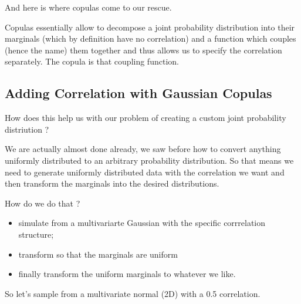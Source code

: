 \documentclass[11pt]{article}
\providecommand{\tightlist}{%
      \setlength{\itemsep}{0pt}\setlength{\parskip}{0pt}}
\begin{document}
And here is where copulas come to our rescue.

Copulas essentially allow to decompose a joint probability distribution
into their marginals (which by definition have no correlation) and a
function which couples (hence the name) them together and thus allows us
to specify the correlation separately. The copula is that coupling
function.

    \hypertarget{adding-correlation-with-gaussian-copulas}{%
\subsection{Adding Correlation with Gaussian
Copulas}\label{adding-correlation-with-gaussian-copulas}}

How does this help us with our problem of creating a custom joint
probability distriution ?

We are actually almost done already, we saw before how to convert
anything uniformly distributed to an arbitrary probability distribution.
So that means we need to generate uniformly distributed data with the
correlation we want and then transform the marginals into the desired
distributions.

How do we do that ?

\begin{itemize}
\tightlist
\item
  simulate from a multivariarte Gaussian with the specific corrrelation
  structure;
\item
  transform so that the marginals are uniform
\item
  finally transform the uniform marginals to whatever we like.
\end{itemize}

So let's sample from a multivariate normal (2D) with a 0.5 correlation.
\end{document}
